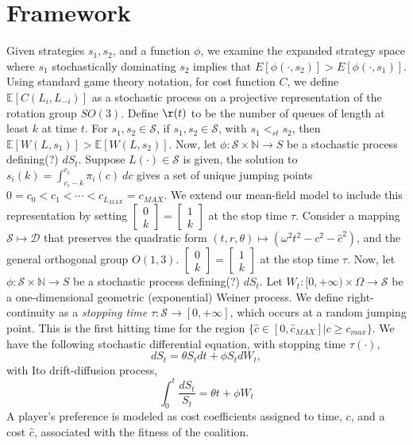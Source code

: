 \documentclass[10pt]{article}
\newcommand{\mcS}{\mathcal{S}}
\newcommand{\mcD}{\mathcal{D}}
\theoremstyle{definition}
\begin{document}
\section{Framework}
Given strategies $s_1, s_2$, and a function $\phi$, we examine the expanded strategy space where $s_1$ stochastically dominating $s_2$ implies that $E[\phi (\cdot, s_2 )] > E[\phi (\cdot, s_1)]$. Using standard game theory notation, for cost function $C$, we define
$\mathbb{E}[C(L_i, L_{-i})]$ as a stochastic process on a projective
representation of the rotation group $SO(3)$. 
Define $\r(t)$ to be the number of queues of length at least $k$ at time $t$.
For $s_1, s_2 \in \mcS$, if $s_1,s_2 \in \mcS$, with $s_1 <_{st} s_2$, then
$\mathbb{E}[W(L,s_1)] > \mathbb{E}[W(L,s_2)]$.
Now, let $\phi:\mcS\times \mathbb{N} \rightarrow S$ be a stochastic process
defining(?) $dS_t$.
Suppose $L(\cdot)\in \mcS$ is given, the solution to
$s_i(k) = \int_{c_i - k}^{c_i} \pi_i(c) \ dc$ gives a set of unique jumping points $0=c_0<
c_1< \cdots < c_{L_{MAX}} = c_{MAX}$. 
We extend our mean-field model to include this
representation by setting $\begin{bmatrix}0 \\ k\end{bmatrix} = \begin{bmatrix}1
\\
k\end{bmatrix}$ at the stop time $\tau$.
Consider a mapping $\mcS\mapsto \mcD$ that preserves the quadratic form $(t, r,
\theta)\mapsto (\omega^2 t^2-c^2-\hat c^2)$, and the general orthogonal group $O(1,3)$.
$\begin{bmatrix}0 \\ k\end{bmatrix} = \begin{bmatrix}1
\\
k\end{bmatrix}$ at the stop time $\tau$.
Now, let $\phi:\mcS\times \mathbb{N} \rightarrow S$ be a stochastic process
defining(?) $dS_t$.
Let $W_t: [0, +\infty) \times \Omega \rightarrow \mcS$ be a
one-dimensional geometric (exponential) Weiner process. We define right-continuity as 
a \emph{stopping time} $\tau:\mcS \rightarrow [0,+\infty]$, which occurs at a random jumping point. This is the first hitting time
for the region $\lbrace \hat c \in [0,\hat c_{MAX}] \vert c \ge c_{max}\rbrace$.
We have the following stochastic differential equation, with stopping time
$\tau(\cdot)$,
$$
    dS_t = \theta S_t dt + \phi S_t dW_t,
$$
with Ito drift-diffusion process,
$$
    \displaystyle\int_0^t \frac{dS_t}{S_t} = \theta t + \phi W_t
$$
A player’s preference is modeled as cost coefficients assigned to time, $c$, and a cost $\hat c$, associated with the fitness of the coalition.
\end{document}
